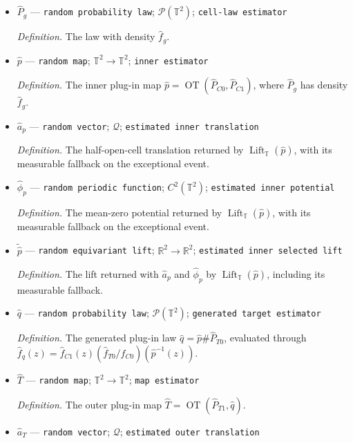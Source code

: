 \documentclass{article}
\begin{document}
\begin{itemize}
  \item \(\widehat P_g\) --- \texttt{random probability law}; \(\mathcal P(\mathbb T^2)\); \texttt{cell-\allowbreak{}law estimator}
  \par\smallskip\noindent\emph{Definition.} The law with density \(\widehat f_g\).
  \item \(\widehat p\) --- \texttt{random map}; \(\mathbb T^2\to\mathbb T^2\); \texttt{inner estimator}
  \par\smallskip\noindent\emph{Definition.} The inner plug-in map \(\widehat p=\operatorname{OT}(\widehat P_{C0},\widehat P_{C1})\), where \(\widehat P_g\) has density \(\widehat f_g\).
  \item \(\widehat a_p\) --- \texttt{random vector}; \(\mathcal Q\); \texttt{estimated inner translation}
  \par\smallskip\noindent\emph{Definition.} The half-open-cell translation returned by \(\operatorname{Lift}_{\mathbb T}(\widehat p)\), with its measurable fallback on the exceptional event.
  \item \(\widehat\phi_p\) --- \texttt{random periodic function}; \(C^2(\mathbb T^2)\); \texttt{estimated inner potential}
  \par\smallskip\noindent\emph{Definition.} The mean-zero potential returned by \(\operatorname{Lift}_{\mathbb T}(\widehat p)\), with its measurable fallback on the exceptional event.
  \item \(\widetilde{\widehat p}\) --- \texttt{random equivariant lift}; \(\mathbb R^2\to\mathbb R^2\); \texttt{estimated inner selected lift}
  \par\smallskip\noindent\emph{Definition.} The lift returned with \(\widehat a_p\) and \(\widehat\phi_p\) by \(\operatorname{Lift}_{\mathbb T}(\widehat p)\), including its measurable fallback.
  \item \(\widehat q\) --- \texttt{random probability law}; \(\mathcal P(\mathbb T^2)\); \texttt{generated target estimator}
  \par\smallskip\noindent\emph{Definition.} The generated plug-in law \(\widehat q=\widehat p\#\widehat P_{T0}\), evaluated through \(\widehat f_q(z)=\widehat f_{C1}(z)(\widehat f_{T0}/\widehat f_{C0})(\widehat p^{-1}(z))\).
  \item \(\widehat T\) --- \texttt{random map}; \(\mathbb T^2\to\mathbb T^2\); \texttt{map estimator}
  \par\smallskip\noindent\emph{Definition.} The outer plug-in map \(\widehat T=\operatorname{OT}(\widehat P_{T1},\widehat q)\).
  \item \(\widehat a_T\) --- \texttt{random vector}; \(\mathcal Q\); \texttt{estimated outer translation}

\end{itemize}
\end{document}
